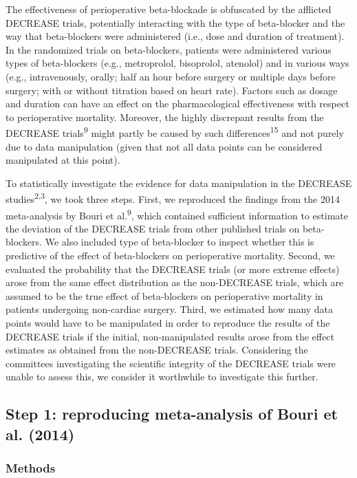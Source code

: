 \documentclass[]{article}
\begin{document}
The effectiveness of perioperative beta-blockade is obfuscated by the
afflicted DECREASE trials, potentially interacting with the type of
beta-blocker and the way that beta-blockers were administered (i.e.,
dose and duration of treatment). In the randomized trials on
beta-blockers, patients were administered various types of beta-blockers
(e.g., metroprolol, bisoprolol, atenolol) and in various ways (e.g.,
intravenously, orally; half an hour before surgery or multiple days
before surgery; with or without titration based on heart rate). Factors
such as dosage and duration can have an effect on the pharmacological
effectiveness with respect to perioperative mortality. Moreover, the
highly discrepant results from the DECREASE trials\textsuperscript{9}
might partly be caused by such differences\textsuperscript{15} and not
purely due to data manipulation (given that not all data points can be
considered manipulated at this point).

To statistically investigate the evidence for data manipulation in the
DECREASE studies\textsuperscript{2,3}, we took three steps. First, we
reproduced the findings from the 2014 meta-analysis by Bouri et
al.\textsuperscript{9}, which contained sufficient information to
estimate the deviation of the DECREASE trials from other published
trials on beta-blockers. We also included type of beta-blocker to
inspect whether this is predictive of the effect of beta-blockers on
perioperative mortality. Second, we evaluated the probability that the
DECREASE trials (or more extreme effects) arose from the same effect
distribution as the non-DECREASE trials, which are assumed to be the
true effect of beta-blockers on perioperative mortality in patients
undergoing non-cardiac surgery. Third, we estimated how many data points
would have to be manipulated in order to reproduce the results of the
DECREASE trials if the initial, non-manipulated results arose from the
effect estimates as obtained from the non-DECREASE trials. Considering
the committees investigating the scientific integrity of the DECREASE
trials were unable to assess this, we consider it worthwhile to
investigate this further.

\subsection{Step 1: reproducing meta-analysis of Bouri et al.
(2014)}\label{step-1-reproducing-meta-analysis-of-bouri-et-al.-2014}

\subsubsection{Methods}\label{methods}
\end{document}
